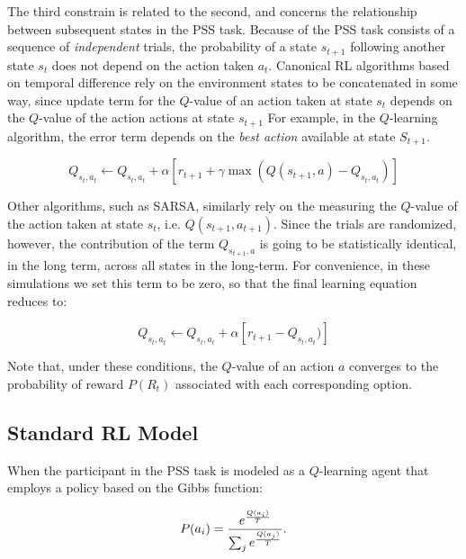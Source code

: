 \documentclass[10pt,letterpaper]{article}
\begin{document}
The third constrain is related to the second, and concerns the relationship between subsequent states in the PSS task. Because of the PSS task consists of a sequence of \emph{independent} trials, the probability of a state $s_{t+1}$ following another state $s_{t}$ does not depend on the action taken $a_t$. Canonical RL algorithms based on temporal difference rely on the environment states to be concatenated in some way, since update term for the $Q$-value of an action taken at state $s_t$ depends on the $Q$-value of the action actions at state $s_{t+1}$ For example, in the $Q$-learning algorithm, the error term depends on the \emph{best action} available at state $S_{t+1}$.

\begin{equation}
Q_{s_t,a_t} \leftarrow Q_{s_t,a_t} + \alpha [r_{t+1} + \gamma \max(Q(s_{t+1}, a) - Q_{s_t,a_t})]
\end{equation}

Other algorithms, such as SARSA, similarly rely on the measuring the $Q$-value of the action taken at state $s_t$, i.e. $Q(s_{t+1}, a_{t+1})$. Since the trials are randomized, however, the contribution of the term $Q_{s_{t+1}, a}$ is going to be statistically identical, in the long term, across all states in the long-term. For convenience, in these simulations we set this term to be zero, so that the final learning equation reduces to:

\begin{equation}
Q_{s_t,a_t} \leftarrow Q_{s_t,a_t} + \alpha [r_{t+1} - Q_{s_t,a_t})]
\end{equation}

Note that, under these conditions, the $Q$-value of an action $a$ converges to the probability of reward $P(R_t)$ associated with each corresponding option.

\subsection{Standard RL Model}

When the participant in the PSS task is modeled as a $Q$-learning agent that employs a policy based on the Gibbs function:

\begin{equation}
P(a_i) = \frac{e^{\frac{Q(a_i)}{T}}}{\sum_{j} e^{\frac{Q(a_j)}{T}}}\\.
\end{equation}
\end{document}
